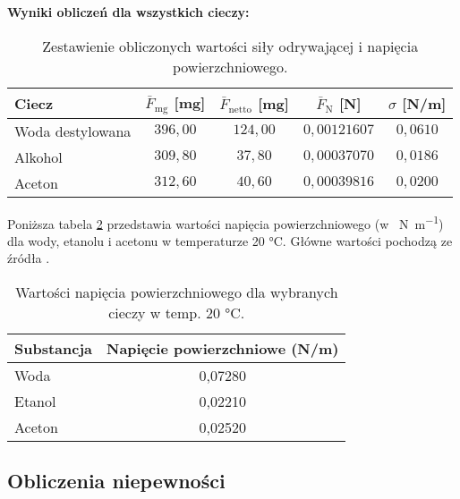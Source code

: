 \documentclass[a4paper,12pt]{article}
\begin{document}
\noindent\textbf{Wyniki obliczeń dla wszystkich cieczy:}

\begin{table}[H]
    \centering
    \begin{tabular}{|l|c|c|c|c|}
        \hline
        \textbf{Ciecz} & \textbf{$\bar{F}_{\text{mg}}$ [mg]} & \textbf{$\bar{F}_{\text{netto}}$ [mg]} & \textbf{$\bar{F}_{\text{N}}$ [N]} & \textbf{$\sigma$ [N/m]} \\
        \hline
        Woda destylowana & $396{,}00$ & $124{,}00$ & $0{,}00121607$ & $0{,}0610$ \\
        \hline
        Alkohol & $309{,}80$ & $37{,}80$ & $0{,}00037070$ & $0{,}0186$ \\
        \hline
        Aceton & $312{,}60$ & $40{,}60$ & $0{,}00039816$ & $0{,}0200$ \\
        \hline
    \end{tabular}
    \caption{Zestawienie obliczonych wartości siły odrywającej i napięcia powierzchniowego.}
    \label{tab:wyniki_obliczen_odrywanie}
\end{table}


Poniższa tabela \ref{tab:napiecia_powierzchniowe} przedstawia wartości napięcia powierzchniowego (w \SI{}{\newton\per\metre}) dla wody, etanolu i acetonu w temperaturze 20 °C. Główne wartości pochodzą ze źródła \cite{SurfaceTensionDE2024}.

\begin{table}[H]
    \centering
    \begin{tabular}{|l|c|}
        \toprule
        Substancja & Napięcie powierzchniowe (N/m) \\ %
        \midrule
        Woda       & 0,07280 \\ %
        \hline
        Etanol     & 0,02210 \\ %
        \hline
        Aceton     & 0,02520 \\ %
        \bottomrule
    \end{tabular}
    \caption{Wartości napięcia powierzchniowego dla wybranych cieczy w temp. 20 °C.}
    \label{tab:napiecia_powierzchniowe}
\end{table}

\subsection{Obliczenia niepewności}
\end{document}
